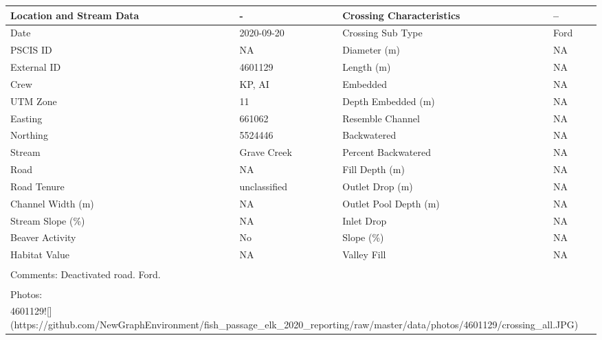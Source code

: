 \documentclass[
]{book}
\begin{document}
\begin{tabular}{l|l|l|l}
\hline
Location and Stream Data & - & Crossing Characteristics & --\\
\hline
Date & 2020-09-20 & Crossing Sub Type & Ford\\
\hline
PSCIS ID & NA & Diameter (m) & NA\\
\hline
External ID & 4601129 & Length (m) & NA\\
\hline
Crew & KP, AI & Embedded & NA\\
\hline
UTM Zone & 11 & Depth Embedded (m) & NA\\
\hline
Easting & 661062 & Resemble Channel & NA\\
\hline
Northing & 5524446 & Backwatered & NA\\
\hline
Stream & Grave Creek & Percent Backwatered & NA\\
\hline
Road & NA & Fill Depth (m) & NA\\
\hline
Road Tenure & unclassified & Outlet Drop (m) & NA\\
\hline
Channel Width (m) & NA & Outlet Pool Depth (m) & NA\\
\hline
Stream Slope (\%) & NA & Inlet Drop & NA\\
\hline
Beaver Activity & No & Slope (\%) & NA\\
\hline
Habitat Value & NA & Valley Fill & NA\\
\hline
\multicolumn{4}{l}{\textsuperscript{} Comments: Deactivated road. Ford.}\\
\multicolumn{4}{l}{\textsuperscript{} Photos:}\\
\multicolumn{4}{l}{4601129![](https://github.com/NewGraphEnvironment/fish\_passage\_elk\_2020\_reporting/raw/master/data/photos/4601129/crossing\_all.JPG)}\\
\end{tabular}
\end{document}
